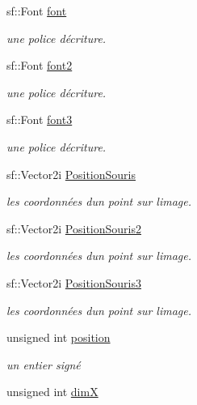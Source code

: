 \begin{DoxyCompactItemize}
sf\+::\+Font \hyperlink{class_s_f_m_l_menu_a4edf61746282316a52f401f8655b0eae}{font}
\begin{DoxyCompactList}\small\item\em une police d\textquotesingle{}écriture. \end{DoxyCompactList}\item 
sf\+::\+Font \hyperlink{class_s_f_m_l_menu_a5c59e11d8f5fb35c0922db98de61fa39}{font2}
\begin{DoxyCompactList}\small\item\em une police d\textquotesingle{}écriture. \end{DoxyCompactList}\item 
sf\+::\+Font \hyperlink{class_s_f_m_l_menu_a49f27c39cdc6106ba0cb3ca253a6cb05}{font3}
\begin{DoxyCompactList}\small\item\em une police d\textquotesingle{}écriture. \end{DoxyCompactList}\item 
sf\+::\+Vector2i \hyperlink{class_s_f_m_l_menu_aff7f7fece811904e034c1420c61f097d}{Position\+Souris}
\begin{DoxyCompactList}\small\item\em les coordonnées d\textquotesingle{}un point sur l\textquotesingle{}image. \end{DoxyCompactList}\item 
sf\+::\+Vector2i \hyperlink{class_s_f_m_l_menu_a0accf7d98ec8ed6f09ddded054550bd6}{Position\+Souris2}
\begin{DoxyCompactList}\small\item\em les coordonnées d\textquotesingle{}un point sur l\textquotesingle{}image. \end{DoxyCompactList}\item 
sf\+::\+Vector2i \hyperlink{class_s_f_m_l_menu_a9107e0e47b55d7f0d9eb448c23f4ec9e}{Position\+Souris3}
\begin{DoxyCompactList}\small\item\em les coordonnées d\textquotesingle{}un point sur l\textquotesingle{}image. \end{DoxyCompactList}\item 
unsigned int \hyperlink{class_s_f_m_l_menu_a094cf249469a2cf7cb00151edc16ee67}{position}
\begin{DoxyCompactList}\small\item\em un entier signé \end{DoxyCompactList}\item 
unsigned int \hyperlink{class_s_f_m_l_menu_a5708eb1cae68873cd20b19eb8a38e75b}{dimX}

\end{DoxyCompactItemize}
